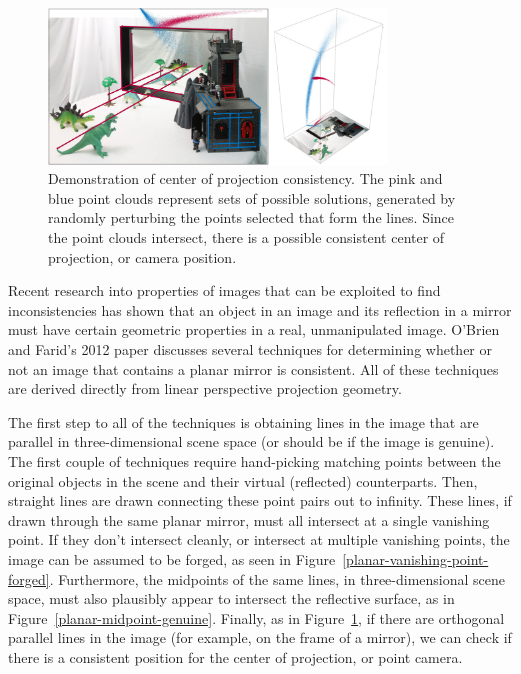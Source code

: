 \documentclass{article}
\begin{document}
\begin{figure}
	\centering
    	\includegraphics[width=0.8\textwidth]{center-of-projection-planar-genuine}
	\caption{Demonstration of center of projection consistency. The pink and blue point clouds represent sets of possible solutions, generated by randomly perturbing the points selected that form the lines. Since the point clouds intersect, there is a possible consistent center of projection, or camera position. \cite[Fig.~6]{obrien12}}
	\label{center-of-projection-planar-genuine}
\end{figure}

Recent research into properties of images that can be exploited to find inconsistencies has shown that an object in an image and its reflection in a mirror must have certain geometric properties in a real, unmanipulated image. O'Brien and Farid's 2012 paper discusses several techniques for determining whether or not an image that contains a planar mirror is consistent.\nocite{obrien12} All of these techniques are derived directly from linear perspective projection geometry.

The first step to all of the techniques is obtaining lines in the image that are parallel in three-dimensional scene space (or should be if the image is genuine). The first couple of techniques require hand-picking matching points between the original objects in the scene and their virtual (reflected) counterparts. Then, straight lines are drawn connecting these point pairs out to infinity. These lines, if drawn through the same planar mirror, must all intersect at a single vanishing point. If they don't intersect cleanly, or intersect at multiple vanishing points, the image can be assumed to be forged, as seen in Figure~\ref{planar-vanishing-point-forged}. Furthermore, the midpoints of the same lines, in three-dimensional scene space, must also plausibly appear to intersect the reflective surface, as in Figure~\ref{planar-midpoint-genuine}. Finally, as in Figure~\ref{center-of-projection-planar-genuine}, if there are orthogonal parallel lines in the image (for example, on the frame of a mirror), we can check if there is a consistent position for the center of projection, or point camera.
\end{document}
